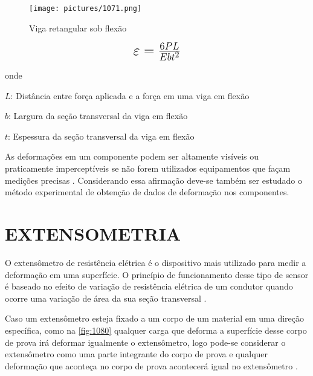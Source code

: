 \begin{figure}[htb]
	\caption{\label{fig:1071} Viga retangular sob flexão}
	\begin{center}
		\texttt{[image: pictures/1071.png]}
	\end{center}
\end{figure}

\begin{equation}\label{eq:Eq_201}%
\mbox{\fontsize{17.28}{21.6}\selectfont\( %
\varepsilon = \frac{6PL}{Eb{t^2}}
\)} %
\end{equation}

onde

$L$: Distância entre força aplicada e a força em uma viga em flexão

$b$: Largura da seção transversal da viga em flexão

$t$: Espessura da seção transversal da viga em flexão

\hfill

As deformações em um componente podem ser altamente visíveis ou praticamente imperceptíveis se não forem utilizados equipamentos que façam medições precisas
\autocite{Hibbeler2010}.
Considerando essa afirmação deve-se também ser estudado o método experimental de obtenção de dados de deformação nos componentes.

\section{EXTENSOMETRIA}

O extensômetro de resistência elétrica é o dispositivo mais utilizado para medir a deformação em uma superfície.
O princípio de funcionamento desse tipo de sensor é baseado no efeito de variação de resistência elétrica de um condutor quando
ocorre uma variação de área da sua seção transversal \autocite{Hollman2011}.

Caso um extensômetro esteja fixado a um corpo de um material em uma direção específica, como na \autoref{fig:1080} qualquer carga que deforma a superfície desse corpo de prova irá
deformar igualmente o extensômetro, logo pode-se considerar o extensômetro como uma parte integrante do corpo de prova e qualquer deformação que aconteça no corpo de
prova acontecerá igual no extensômetro \autocite{Hibbeler2010}.


